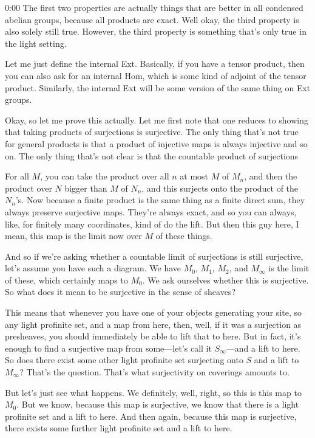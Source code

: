 \begin{unfinished}{0:00}
The first two properties are actually things that are better in all condensed abelian groups, because all products are exact. Well okay, the third property is also solely still true. However, the third property is something that's only true in the light setting.

Let me just define the internal Ext. Basically, if you have a tensor product, then you can also ask for an internal Hom, which is some kind of adjoint of the tensor product. Similarly, the internal Ext will be some version of the same thing on Ext groups.

Okay, so let me prove this actually. Let me first note that one reduces to showing that taking products of surjections is surjective. The only thing that's not true for general products is that a product of injective maps is always injective and so on. The only thing that's not clear is that the countable product of surjections

For all $M$, you can take the product over all $n$ at most $M$ of $M_n$, and then the product over $N$ bigger than $M$ of $N_n$, and this surjects onto the product of the $N_n$'s. Now because a finite product is the same thing as a finite direct sum, they always preserve surjective maps. They're always exact, and so you can always, like, for finitely many coordinates, kind of do the lift. But then this guy here, I mean, this map is the limit now over $M$ of these things.

And so if we're asking whether a countable limit of surjections is still surjective, let's assume you have such a diagram. We have $M_0$, $M_1$, $M_2$, and $M_\infty$ is the limit of these, which certainly maps to $M_0$. We ask ourselves whether this is surjective. So what does it mean to be surjective in the sense of sheaves?

This means that whenever you have one of your objects generating your site, so any light profinite set, and a map from here, then, well, if it was a surjection as presheaves, you should immediately be able to lift that to here. But in fact, it's enough to find a surjective map from some---let's call it $S_\infty$---and a lift to here. So does there exist some other light profinite set surjecting onto $S$ and a lift to $M_\infty$? That's the question. That's what surjectivity on coverings amounts to.

But let's just see what happens. We definitely, well, right, so this is this map to $M_0$. But we know, because this map is surjective, we know that there is a light profinite set and a lift to here. And then again, because this map is surjective, there exists some further light profinite set and a lift to here.


\end{unfinished}
